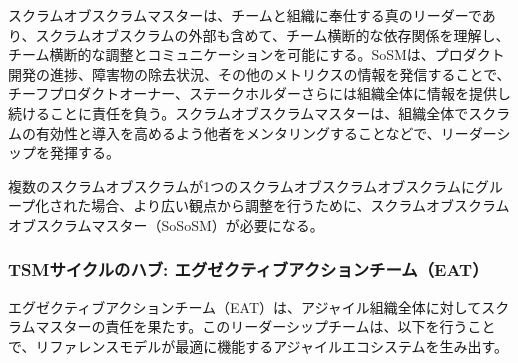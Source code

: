 \documentclass[12pt,a4paper,parskip=full]{scrartcl}
\begin{document}

スクラムオブスクラムマスターは、チームと組織に奉仕する真のリーダーであり、スクラムオブスクラムの外部も含めて、チーム横断的な依存関係を理解し、チーム横断的な調整とコミュニケーションを可能にする。SoSMは、プロダクト開発の進捗、障害物の除去状況、その他のメトリクスの情報を発信することで、チーフプロダクトオーナー、ステークホルダーさらには組織全体に情報を提供し続けることに責任を負う。スクラムオブスクラムマスターは、組織全体でスクラムの有効性と導入を高めるよう他者をメンタリングすることなどで、リーダーシップを発揮する。

複数のスクラムオブスクラムが1つのスクラムオブスクラムオブスクラムにグループ化された場合、より広い観点から調整を行うために、スクラムオブスクラムオブスクラムマスター（SoSoSM）が必要になる。

\subsubsection{TSMサイクルのハブ: エグゼクティブアクションチーム（EAT）}\label{the-hub-of-the-sm-cycle}

エグゼクティブアクションチーム（EAT）は、アジャイル組織全体に対してスクラムマスターの責任を果たす。このリーダーシップチームは、以下を行うことで、リファレンスモデルが最適に機能するアジャイルエコシステムを生み出す。
\end{document}
